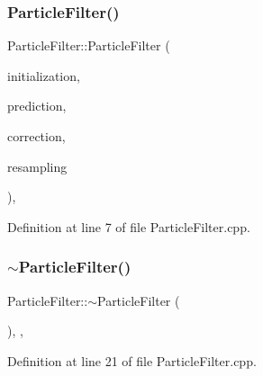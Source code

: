 \subsubsection{\texorpdfstring{Particle\+Filter()}{ParticleFilter()}\hspace{0.1cm}{\footnotesize\ttfamily [1/2]}}
{\footnotesize\ttfamily Particle\+Filter\+::\+Particle\+Filter (\begin{DoxyParamCaption}\item[{std\+::unique\+\_\+ptr$<$ \mbox{\hyperlink{classbfl_1_1ParticleSetInitialization}{Particle\+Set\+Initialization}} $>$}]{initialization,  }\item[{std\+::unique\+\_\+ptr$<$ \mbox{\hyperlink{classbfl_1_1PFPrediction}{P\+F\+Prediction}} $>$}]{prediction,  }\item[{std\+::unique\+\_\+ptr$<$ \mbox{\hyperlink{classbfl_1_1PFCorrection}{P\+F\+Correction}} $>$}]{correction,  }\item[{std\+::unique\+\_\+ptr$<$ \mbox{\hyperlink{classbfl_1_1Resampling}{Resampling}} $>$}]{resampling }\end{DoxyParamCaption})\hspace{0.3cm}{\ttfamily [protected]}, {\ttfamily [noexcept]}}



Definition at line 7 of file Particle\+Filter.\+cpp.

\mbox{\label{classbfl_1_1ParticleFilter_a11dcf55dd8fa9f246c2af2bf6decbaa3}} 
\subsubsection{\texorpdfstring{$\sim$\+Particle\+Filter()}{~ParticleFilter()}}
{\footnotesize\ttfamily Particle\+Filter\+::$\sim$\+Particle\+Filter (\begin{DoxyParamCaption}{ }\end{DoxyParamCaption})\hspace{0.3cm}{\ttfamily [protected]}, {\ttfamily [virtual]}, {\ttfamily [noexcept]}}



Definition at line 21 of file Particle\+Filter.\+cpp.

\mbox{\label{classbfl_1_1ParticleFilter_a957e97f5ea94684b0b33f7f4511b29e5}} 
